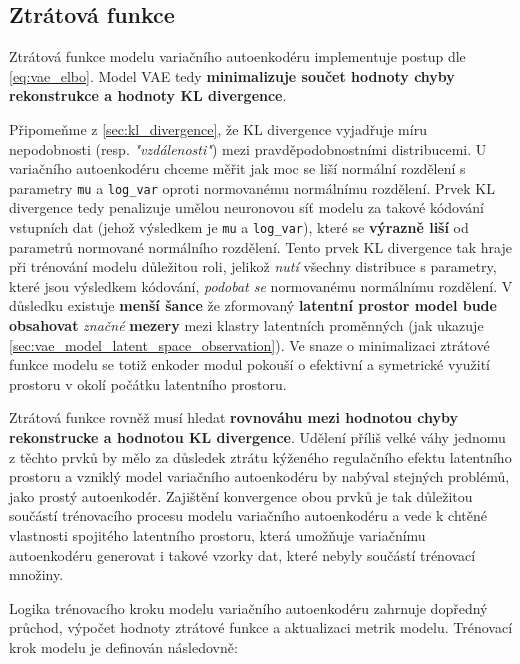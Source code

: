 \subsection{Ztrátová funkce}
\label{sec:vae_model_loss_function}
Ztrátová funkce modelu variačního autoenkodéru implementuje postup dle \autoref{eq:vae_elbo}.
Model VAE tedy \textbf{minimalizuje součet hodnoty chyby rekonstrukce a hodnoty KL divergence}.

Připomeňme z \autoref{sec:kl_divergence}, že KL divergence vyjadřuje míru nepodobnosti (resp. \emph{"vzdálenosti"}) mezi pravděpodobnostními distribucemi.
U variačního autoenkodéru chceme měřit jak moc se liší normální rozdělení s parametry \lstinline{mu} a \lstinline{log_var} oproti normovanému normálnímu rozdělení.
Prvek KL divergence tedy penalizuje umělou neuronovou síť modelu za takové kódování vstupních dat (jehož výsledkem je \lstinline{mu} a \lstinline{log_var}), které se \textbf{výrazně liší} od parametrů normované normálního rozdělení.
Tento prvek KL divergence tak hraje při trénování modelu důležitou roli, jelikož \emph{nutí} všechny distribuce s parametry, které jsou výsledkem kódování, \emph{podobat se} normovanému normálnímu rozdělení. 
V důsledku existuje \textbf{menší šance} že zformovaný \textbf{latentní prostor model bude obsahovat} \emph{značné} \textbf{mezery} mezi klastry latentních proměnných (jak ukazuje \autoref{sec:vae_model_latent_space_observation}).
Ve snaze o minimalizaci ztrátové funkce modelu se totiž enkoder modul pokouší o efektivní a symetrické využití prostoru v okolí počátku latentního prostoru.

Ztrátová funkce rovněž musí hledat \textbf{rovnováhu mezi hodnotou chyby rekonstrucke a hodnotou KL divergence}.
Udělení příliš velké váhy jednomu z těchto prvků by mělo za důsledek ztrátu kýženého regulačního efektu latentního prostoru a vzniklý model variačního autoenkodéru by nabýval stejných problémů, jako prostý autoenkodér.
Zajištění konvergence obou prvků je tak důležitou součástí trénovacího procesu modelu variačního autoenkodéru a vede k chtěné vlastnosti spojitého latentního prostoru, která umožňuje variačnímu autoenkodéru generovat i takové vzorky dat, které nebyly součástí trénovací množiny.

Logika trénovacího kroku modelu variačního autoenkodéru zahrnuje dopředný průchod, výpočet hodnoty ztrátové funkce a aktualizaci metrik modelu.
Trénovací krok modelu je definován následovně:



